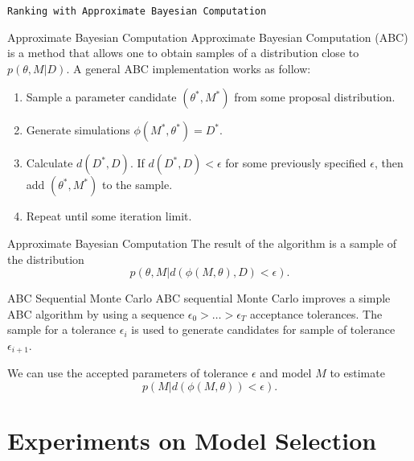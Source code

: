 \documentclass{beamer}
\begin{document}
\begin{frame}{}
\begin{center}
    \texttt{Ranking with Approximate Bayesian Computation}
\end{center}
\end{frame}


\begin{frame}{Approximate Bayesian Computation}
Approximate Bayesian Computation (ABC) is a method that allows one to
obtain samples of a distribution close to $p (\theta, M | D)$. \pause
A general ABC implementation works as follow:

\begin{enumerate}
    \pause
    \item{Sample a parameter candidate $(\theta^*, M^*)$ from some 
        proposal distribution.}
    \pause
    \item{Generate simulations $\phi (M^*, \theta^*) = D^*$.}
    \pause
    \item{Calculate $d (D^*, D).$ If $d (D^*, D) < \epsilon$ for some 
        previously specified $\epsilon$, then add $(\theta^*, M^*)$ to 
        the sample.}
    \pause
    \item{Repeat until some iteration limit.}
\end{enumerate}
\end{frame}


\begin{frame}{Approximate Bayesian Computation}
The result of the algorithm is a sample of the distribution 
\begin{equation*}
p (\theta, M| d (\phi (M, \theta), D) < \epsilon).
\end{equation*}

\end{frame}

\begin{frame}{ABC Sequential Monte Carlo}
ABC sequential Monte Carlo improves a simple ABC algorithm by using a 
sequence $\epsilon_0 > \ldots > \epsilon_T$ acceptance tolerances. 
\pause The sample for a tolerance $\epsilon_i$ is used to generate 
candidates for sample of tolerance $\epsilon_{i + 1}$.

\pause
We can use the accepted parameters of tolerance $\epsilon$ and model $M$
to estimate 
\begin{equation*}
    p (M | d (\phi (M, \theta)) < \epsilon).
\end{equation*}
\end{frame}

\section{Experiments on Model Selection}
\end{document}
